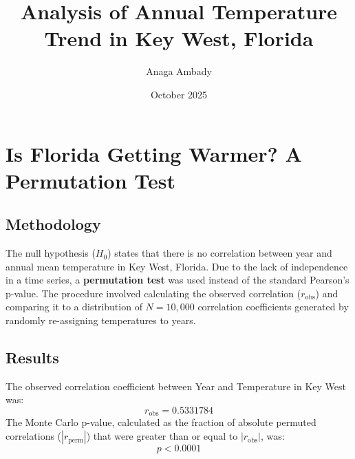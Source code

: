 \documentclass[11pt,a4paper]{article}
\title{Analysis of Annual Temperature Trend in Key West, Florida}
\author{Anaga Ambady}
\date{October 2025}
\begin{document}
\maketitle
\thispagestyle{empty} %

\section*{Is Florida Getting Warmer? A Permutation Test}

\subsection*{Methodology}
The null hypothesis ($H_0$) states that there is no correlation between year and annual mean temperature in Key West, Florida. 
Due to the lack of independence in a time series, a \textbf{permutation test} was used instead of the standard Pearson's p-value. 
The procedure involved calculating the observed correlation ($r_{\text{obs}}$) and comparing it to a distribution of 
$N = 10{,}000$ correlation coefficients generated by randomly re-assigning temperatures to years.

\subsection*{Results}
The observed correlation coefficient between Year and Temperature in Key West was:
\[
r_{\text{obs}} = 0.5331784
\]
The Monte Carlo p-value, calculated as the fraction of absolute permuted correlations 
($|r_{\text{perm}}|$) that were greater than or equal to $|r_{\text{obs}}|$, was:
\[
p < 0.0001
\]
\end{document}
